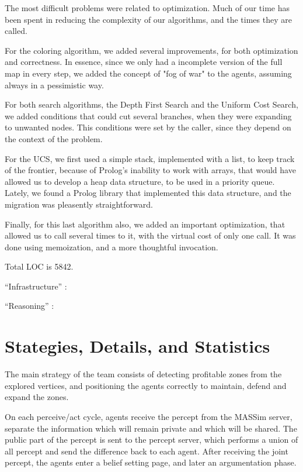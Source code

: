 \documentclass{llncs2e/llncs}
\begin{document}
    The most difficult problems were related to optimization. Much of our time has 
    been spent in reducing the complexity of our algorithms, and the times they 
    are called.

    For the coloring algorithm, we added several improvements, for both 
    optimization and correctness. In essence, since we only had a incomplete 
    version of the full map in every step, we added the concept of "fog of war" to 
    the agents, assuming always in a pessimistic way. 

    For both search algorithms, the Depth First Search and the Uniform Cost 
    Search, we added conditions that could cut several branches, when they were 
    expanding to unwanted nodes. This conditions were set by the caller, since 
    they depend on the context of the problem.

    For the UCS, we first used a simple stack, implemented with a list, to keep 
    track of the frontier, because of Prolog's inability to work with arrays, that 
    would have allowed us to develop a heap data structure, to be used in a 
    priority queue. Lately, we found a Prolog library that implemented this data 
    structure, and the migration was pleasently straightforward.

    Finally, for this last algorithm also, we added an important optimization, 
    that allowed us to call several times to it, with the virtual cost of only one 
    call. It was done using memoization, and a more thoughtful invocation.

    Total LOC is 5842. 

    ``Infrastructure'' : 

    ``Reasoning'' :


\section{Stategies, Details, and Statistics}

    The main strategy of the team consists of detecting profitable zones from the 
    explored vertices, and positioning the agents correctly to maintain, defend 
    and expand the zones.

    On each perceive/act cycle, agents receive the percept from the MASSim server, 
    separate the information which will remain private and which will be shared. 
    The public part of the percept is sent to the percept server, which performs a 
    union of all percept and send the difference back to each agent. After 
    receiving the joint percept, the agents enter a belief setting page, and later 
    an argumentation phase.
\end{document}

